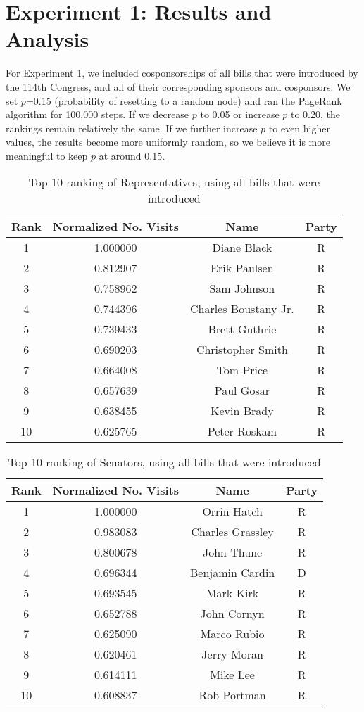 \documentclass[11pt]{article}
\begin{document}
\section*{Experiment 1: Results and Analysis}
For Experiment 1, we included cosponsorships of all bills that were introduced by the 114th Congress, and all of their corresponding sponsors and cosponsors. We set $p$=0.15 (probability of resetting to a random node) and ran the PageRank algorithm for 100,000 steps. If we decrease $p$ to 0.05 or increase $p$ to 0.20, the rankings remain relatively the same. If we further increase $p$ to even higher values, the results become more uniformly random, so we believe it is more meaningful to keep  $p$ at around 0.15. 


\begin{table}[h!]
\centering
 \begin{tabular}{|c | c |c |c|} 
 \hline
 Rank & Normalized No. Visits & Name & Party \\ [0.5ex] 
 \hline
1  & 1.000000 & Diane Black & R \\
2  & 0.812907 & Erik Paulsen & R \\
3  & 0.758962 & Sam Johnson & R \\
4  & 0.744396 & Charles Boustany Jr. & R \\
5  & 0.739433 & Brett Guthrie & R \\
6  & 0.690203 & Christopher Smith & R \\
7  & 0.664008 & Tom Price & R \\
8  & 0.657639 & Paul Gosar & R \\
9  & 0.638455 & Kevin Brady & R \\
10 &  0.625765 &  Peter Roskam & R \\
 \hline
 
\end{tabular}
\caption{Top 10 ranking of Representatives, using all bills that were introduced}
\label{table:experiment1}
\end{table}

\begin{table}[h!]
\centering
 \begin{tabular}{|c | c |c |c|} 
 \hline
 Rank & Normalized No. Visits & Name & Party \\ [0.5ex] 
 \hline
1  & 1.000000 & Orrin Hatch &R\\
2  & 0.983083 & Charles Grassley &R\\
3  & 0.800678 & John Thune &R\\
4  & 0.696344  & Benjamin Cardin & D\\
5  & 0.693545  & Mark Kirk & R\\
6  & 0.652788  & John Cornyn & R\\
7  & 0.625090  & Marco Rubio & R\\
8  & 0.620461  & Jerry Moran & R\\
9  & 0.614111  & Mike Lee & R\\
10 &  0.608837 &  Rob Portman & R\\
 \hline
 
\end{tabular}
\caption{Top 10 ranking of Senators, using all bills that were introduced}
\label{table:experiment1_2}
\end{table}
\end{document}
